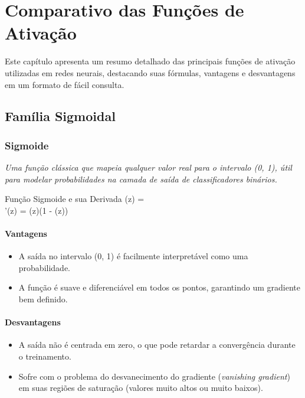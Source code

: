 \chapter{Comparativo das Funções de Ativação}
\label{cap:comparativo-ativacao}

Este capítulo apresenta um resumo detalhado das principais funções de ativação utilizadas em redes neurais, destacando suas fórmulas, vantagens e desvantagens em um formato de fácil consulta.

\section{Família Sigmoidal}

\subsection{Sigmoide}

\textit{Uma função clássica que mapeia qualquer valor real para o intervalo (0, 1), útil para modelar probabilidades na camada de saída de classificadores binários.}

\begin{equacaodestaque}{Função Sigmoide e sua Derivada}
    \sigma(z) =  \\
    \sigma'(z) = \sigma(z)(1 - \sigma(z))
\end{equacaodestaque}

\subsubsection*{Vantagens}
\begin{itemize}
    \item A saída no intervalo (0, 1) é facilmente interpretável como uma probabilidade.
    \item A função é suave e diferenciável em todos os pontos, garantindo um gradiente bem definido.
\end{itemize}

\subsubsection*{Desvantagens}
\begin{itemize}
    \item A saída não é centrada em zero, o que pode retardar a convergência durante o treinamento.
    \item Sofre com o problema do desvanecimento do gradiente (\textit{vanishing gradient}) em suas regiões de saturação (valores muito altos ou muito baixos).
\end{itemize}

